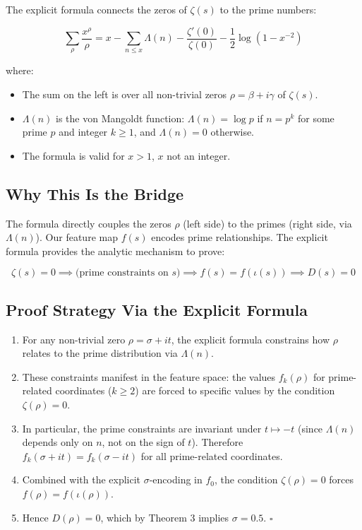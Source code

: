 \documentclass[11pt]{article}
\begin{document}
The explicit formula connects the zeros of $\zeta(s)$ to the prime numbers:

\begin{equation}\label{eq:vonmangoldt}
\sum_{\rho} \frac{x^{\rho}}{\rho} = x - \sum_{n \le x} \Lambda(n) - \frac{\zeta'(0)}{\zeta(0)} - \frac{1}{2} \log(1 - x^{-2})
\end{equation}

where:
\begin{itemize}[nosep]
\item The sum on the left is over all non-trivial zeros $\rho = \beta + i\gamma$ of $\zeta(s)$.
\item $\Lambda(n)$ is the von Mangoldt function: $\Lambda(n) = \log p$ if $n = p^k$ for some prime $p$ and integer $k \ge 1$, and $\Lambda(n) = 0$ otherwise.
\item The formula is valid for $x > 1$, $x$ not an integer.
\end{itemize}

\subsection{Why This Is the Bridge}

The formula directly couples the zeros $\rho$ (left side) to the primes (right side, via $\Lambda(n)$). Our feature map $f(s)$ encodes prime relationships. The explicit formula provides the analytic mechanism to prove:

$$\zeta(s) = 0 \implies \text{(prime constraints on } s \text{)} \implies f(s) = f(\iota(s)) \implies D(s) = 0$$

\subsection{Proof Strategy Via the Explicit Formula}

\begin{enumerate}
\item For any non-trivial zero $\rho = \sigma + it$, the explicit formula constrains how $\rho$ relates to the prime distribution via $\Lambda(n)$.
\item These constraints manifest in the feature space: the values $f_k(\rho)$ for prime-related coordinates ($k \ge 2$) are forced to specific values by the condition $\zeta(\rho) = 0$.
\item In particular, the prime constraints are invariant under $t \mapsto -t$ (since $\Lambda(n)$ depends only on $n$, not on the sign of $t$). Therefore $f_k(\sigma + it) = f_k(\sigma - it)$ for all prime-related coordinates.
\item Combined with the explicit $\sigma$-encoding in $f_0$, the condition $\zeta(\rho) = 0$ forces $f(\rho) = f(\iota(\rho))$.
\item Hence $D(\rho) = 0$, which by Theorem 3 implies $\sigma = 0.5$. $\square$
\end{enumerate}
\end{document}
